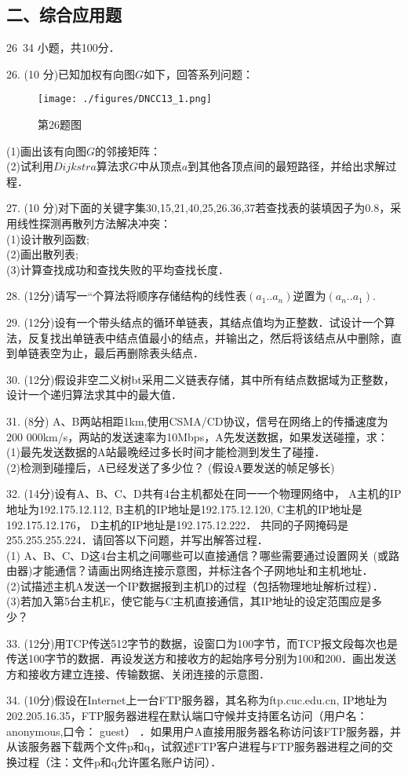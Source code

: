 \subsection{二、综合应用题}
26~34 小题，共100分．

26. (10 分)已知加权有向图$G$如下，回答系列问题： \\
\begin{figure}[ht]
\centering
\texttt{[image: ./figures/DNCC13\_1.png]}
\caption{第26题图} \label{DNCC13_fig1}
\end{figure}
(1)画出该有向图$G$的邻接矩阵： \\
(2)试利用$Dijkstra$算法求$G$中从顶点$a$到其他各顶点间的最短路径，并给出求解过程．

27. (10 分)对下面的关键字集{30,15,21,40,25,26.36,37}若查找表的装填因子为$0.8$，采用线性探测再散列方法解决冲突： \\
(1)设计散列函数; \\
(2)画出散列表; \\
(3)计算查找成功和查找失败的平均查找长度．

28. (12分)请写一“个算法将顺序存储结构的线性表$(a_1..a_n)$逆置为$(a_n..a_1)$.

29. (12分)设有一个带头结点的循环单链表，其结点值均为正整数．试设计一个算法，反复找出单链表中结点值最小的结点，并输出之，然后将该结点从中删除，直到单链表空为止，最后再删除表头结点．

30. (12分)假设非空二义树bt采用二义链表存储，其中所有结点数据域为正整数，设计一个递归算法求其中的最大值．

31. (8分) A、B两站相距1km,使用CSMA/CD协议，信号在网络上的传播速度为200 000km/s，两站的发送速率为10Mbps，A先发送数据，如果发送碰撞，求： \\
(1)最先发送数据的A站最晚经过多长时间才能检测到发生了碰撞． \\
(2)检测到碰撞后，A已经发送了多少位？ (假设A要发送的帧足够长)

32. (14分)设有A、B、C、D共有4台主机都处在同一一个物理网络中， A主机的IP地址为192.175.12.112, B主机的IP地址是192.175.12.120, C主机的IP地址是192.175.12.176， D主机的IP地址是192.175.12.222． 共同的子网掩码是255.255.255.224．请回答以下问题，并写出解答过程． \\
(1) A、B、C、D这4台主机之间哪些可以直接通信？哪些需要通过设置网关
(或路由器)才能通信？请画出网络连接示意图，并标注各个子网地址和主机地址． \\
(2)试描述主机A发送一个IP数据报到主机D的过程（包括物理地址解析过程）． \\
(3)若加入第5台主机E，使它能与C主机直接通信，其IP地址的设定范围应是多少？

33. (12分)用TCP传送512字节的数据，设窗口为100字节，而TCP报文段每次也是传送100字节的数据．再设发送方和接收方的起始序号分别为100和200．画出发送方和接收方建立连接、传输数据、关闭连接的示意图．

34. (10分)假设在Internet上一台FTP服务器，其名称为ftp.cuc.edu.cn, IP地址为202.205.16.35，FTP服务器进程在默认端口守候并支持匿名访问（用户名：anonymous,口令： guest） ．如果用户A直接用服务器名称访问该FTP服务器，并从该服务器下载两个文件p和q，试叙述FTP客户进程与FTP服务器进程之间的交换过程（注：文件p和q允许匿名账户访问）．